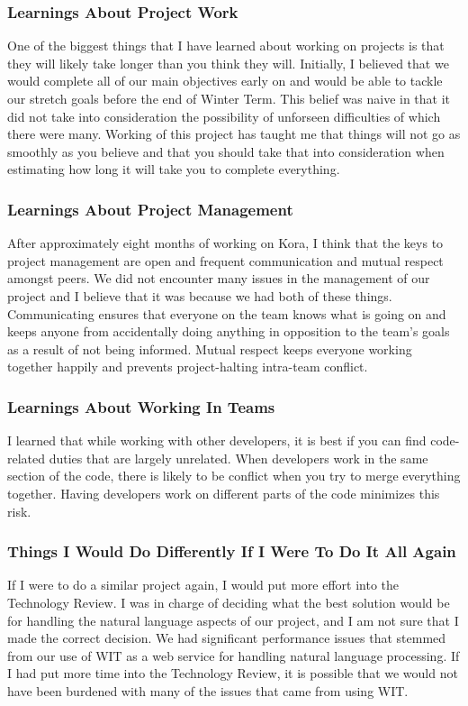 \documentclass[onecolumn, draftclsnofoot,10pt, compsoc]{IEEEtran}
\begin{document}
	\subsubsection{Learnings About Project Work}
		One of the biggest things that I have learned about working on projects is that they will likely take longer than you think they will.
		Initially, I believed that we would complete all of our main objectives early on and would be able to tackle our stretch goals before the end of Winter Term.
		This belief was naive in that it did not take into consideration the possibility of unforseen difficulties of which there were many.
		Working of this project has taught me that things will not go as smoothly as you believe and that you should take that into consideration when estimating how long it will take you to complete everything.

	\subsubsection{Learnings About Project Management}
		After approximately eight months of working on Kora, I think that the keys to project management are open and frequent communication and mutual respect amongst peers.
		We did not encounter many issues in the management of our project and I believe that it was because we had both of these things.
		Communicating ensures that everyone on the team knows what is going on and keeps anyone from accidentally doing anything in opposition to the team's goals as a result of not being informed.
		Mutual respect keeps everyone working together happily and prevents project-halting intra-team conflict.

	\subsubsection{Learnings About Working In Teams}
		I learned that while working with other developers, it is best if you can find code-related duties that are largely unrelated.
		When developers work in the same section of the code, there is likely to be conflict when you try to merge everything together.
		Having developers work on different parts of the code minimizes this risk.

	\subsubsection{Things I Would Do Differently If I Were To Do It All Again}
		If I were to do a similar project again, I would put more effort into the Technology Review.
		I was in charge of deciding what the best solution would be for handling the natural language aspects of our project, and I am not sure that I made the correct decision.
		We had significant performance issues that stemmed from our use of WIT as a web service for handling natural language processing.
		If I had put more time into the Technology Review, it is possible that we would not have been burdened with many of the issues that came from using WIT.
\end{document}
